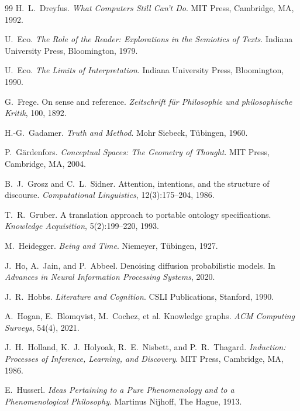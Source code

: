 \documentclass[12pt, a4paper]{article}
\begin{document}
\begin{thebibliography}{99}
H.~L.~Dreyfus.
\newblock \textit{What Computers Still Can't Do}.
\newblock MIT Press, Cambridge, MA, 1992.

U.~Eco.
\newblock \textit{The Role of the Reader: Explorations in the Semiotics of Texts}.
\newblock Indiana University Press, Bloomington, 1979.

U.~Eco.
\newblock \textit{The Limits of Interpretation}.
\newblock Indiana University Press, Bloomington, 1990.

G.~Frege.
\newblock On sense and reference.
\newblock \textit{Zeitschrift für Philosophie und philosophische Kritik}, 100, 1892.

H.-G.~Gadamer.
\newblock \textit{Truth and Method}.
\newblock Mohr Siebeck, Tübingen, 1960.

P.~Gärdenfors.
\newblock \textit{Conceptual Spaces: The Geometry of Thought}.
\newblock MIT Press, Cambridge, MA, 2004.

B.~J.~Grosz and C.~L.~Sidner.
\newblock Attention, intentions, and the structure of discourse.
\newblock \textit{Computational Linguistics}, 12(3):175--204, 1986.

T.~R.~Gruber.
\newblock A translation approach to portable ontology specifications.
\newblock \textit{Knowledge Acquisition}, 5(2):199--220, 1993.

M.~Heidegger.
\newblock \textit{Being and Time}.
\newblock Niemeyer, Tübingen, 1927.

J.~Ho, A.~Jain, and P.~Abbeel.
\newblock Denoising diffusion probabilistic models.
\newblock In \textit{Advances in Neural Information Processing Systems}, 2020.

J.~R.~Hobbs.
\newblock \textit{Literature and Cognition}.
\newblock CSLI Publications, Stanford, 1990.

A.~Hogan, E.~Blomqvist, M.~Cochez, et al.
\newblock Knowledge graphs.
\newblock \textit{ACM Computing Surveys}, 54(4), 2021.

J.~H.~Holland, K.~J.~Holyoak, R.~E.~Nisbett, and P.~R.~Thagard.
\newblock \textit{Induction: Processes of Inference, Learning, and Discovery}.
\newblock MIT Press, Cambridge, MA, 1986.

E.~Husserl.
\newblock \textit{Ideas Pertaining to a Pure Phenomenology and to a Phenomenological Philosophy}.
\newblock Martinus Nijhoff, The Hague, 1913.


\end{thebibliography}
\end{document}
